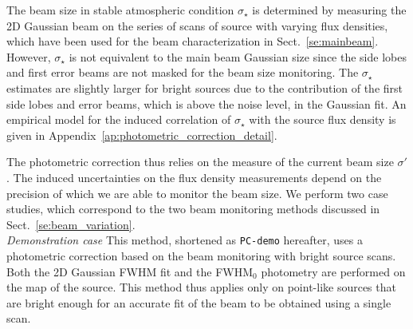 The beam size in stable atmospheric condition $\sigma_\star$ is
determined by measuring the 2D Gaussian beam on the series of scans of
source with varying flux densities, which have been used for the beam
characterization in Sect.~\ref{se:mainbeam}. However, $\sigma_\star$
is not equivalent to the main beam Gaussian size since the side lobes
and first error beams are not masked for the beam size
monitoring. The $\sigma_\star$ estimates are slightly
larger {\lp for bright sources due to the contribution of the first side
lobes and error beams, which is above the noise level, in the Gaussian fit.}  
An empirical model for the induced correlation of
$\sigma_\star$ with the source flux density is given in
Appendix~\ref{ap:photometric_correction_detail}.

The photometric correction thus relies on the measure of the current beam
size $\sigma'$. The induced uncertainties on the flux density
measurements depend on the precision of which we are able to monitor
the beam size. We perform two case studies, which correspond to the
two beam monitoring methods discussed in
Sect.~\ref{se:beam_variation}.\\

\noindent \emph{Demonstration case} This method, shortened as {\tt PC-demo}
hereafter, uses a photometric correction based on the beam monitoring
with bright source scans. Both the 2D Gaussian FWHM fit and the
FWHM$_0$ photometry are performed on the map of the
source. This method thus applies only on point-like
sources that are bright enough for an accurate fit of the beam to be
obtained using a single scan.

